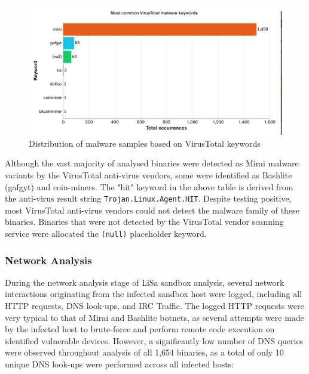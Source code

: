 \begin{figure}[!htb]
    \centering
    \includegraphics[width=0.75\linewidth]{results/vt_keywords.png}
    \caption{Distribution of malware samples based on VirusTotal keywords}
    \label{fig:vt_keywords} 
\end{figure}

Although the vast majority of analysed binaries were detected as Mirai malware variants by the VirusTotal anti-virus vendors, some were identified as Bashlite (gafgyt) and coin-miners. The "hit" keyword in the above table is derived from the anti-virus result string \texttt{Trojan.Linux.Agent.HIT}. Despite testing positive, most VirusTotal anti-virus vendors could not detect the malware family of these binaries. Binaries that were not detected by the VirusTotal vendor scanning service were allocated the \texttt{(null)} placeholder keyword.


\subsubsection{Network Analysis}

During the network analysis stage of LiSa sandbox analysis, several network interactions originating from the infected sandbox host were logged, including all HTTP requests, DNS look-ups, and IRC Traffic. The logged HTTP requests were very typical to that of Mirai and Bashlite botnets, as several attempts were made by the infected host to brute-force and perform remote code execution on identified vulnerable devices. However, a significantly low number of DNS queries were observed throughout analysis of all 1,654 binaries, as a total of only 10 unique DNS look-ups were performed across all infected hosts:

